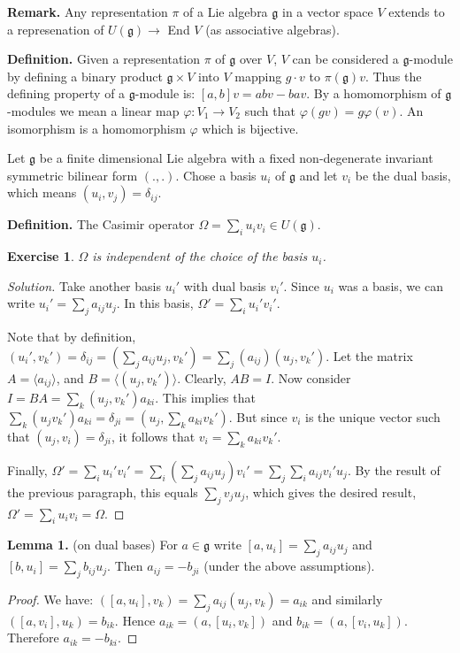 \documentclass[12pt, fullpage]{article}
\newtheorem{exercise}{Exercise}[section]
\newcommand{\g}{\mathfrak{g}}
\begin{document}
{\bf Remark.}  Any representation $\pi$ of a Lie algebra $\g$ in a vector space $V$ extends to a represenation of $U(\g) \rightarrow$ End $V$ (as associative algebras).  

{\bf Definition.}  Given a representation $\pi$ of $\g$ over $V$, $V$ can be considered a $\g$-module by defining a binary product $\g \times  V$ into $V$ mapping $g\cdot v$ to $\pi (\g) v$.  Thus the defining property of a $\g$-module is: $[a,b]v=ab v - ba v$.  By a homomorphism of $\g$-modules we mean a linear map $\varphi : V_1 \rightarrow V_2$ such that $\varphi(gv) = g \varphi(v)$.  An isomorphism is a homomorphism $\varphi$ which is bijective.  


Let $\g$ be a finite dimensional Lie algebra with a fixed non-degenerate invariant symmetric bilinear form $(.,.)$.  Chose a basis ${u_i}$ of $\g$ and let ${v_i}$ be the dual basis, which means $(u_i, v_j)= \delta_{ij}$.  

{\bf Definition.}  The Casimir operator $\Omega = \sum_i u_i v_i \in U(\g)$.

\begin{exercise}
$\Omega$ is independent of the choice of the basis ${u_i}$.
\end{exercise}
\begin{proof}[Solution]

Take another basis ${{u_i}'}$ with dual basis ${{v_i}'}$.  Since ${u_i}$ was a basis, we can write ${u_i}' = \sum_j a_{ij} u_j$.  In this basis, $\Omega' =  \sum_i {u_i}' {v_i}'$.  

Note that by definition,  $({u_i}', {v_k}') = \delta_{ij} = (\sum_j a_{ij} u_j, v_k') = \sum_j (a_{ij}) (u_j, v_k')$.  Let the matrix $A = \langle a_{ij} \rangle$, and $B = \langle (u_j, v_k') \rangle$.  Clearly, $AB=I$.  Now consider $I=BA =\sum_k (u_j, v_k') a_{ki}$.  This implies that $\sum_k (u_j v_k') a_{ki} = \delta_{ji} = (u_j, \sum_k a_{ki} v_k')$.  But since $v_i$ is the unique vector such that $(u_j, v_i) = \delta_{ji}$, it follows that $v_i = \sum_k a_{ki} v_k'$.


Finally, $\Omega' =  \sum_i {u_i}' {v_i}' = \sum_i ( \sum_j a_{ij} u_j) {v_i}' = \sum_{j} \sum_i a_{ij} {v_i}' u_j$.  By the result of the previous paragraph, this equals $\sum_j v_j u_j$, which gives the desired result, $\Omega' = \sum_i u_i v_i = \Omega$.

\end{proof}

{\bf Lemma 1.}
(on dual bases)
For $a\in\g$ write $[a,u_i]=\sum_j a_{ij}u_j$ and $[b,u_i]=\sum_j
b_{ij}u_j$.  Then $a_{ij}=-b_{ji}$ (under the above assumptions).
\begin{proof}
We have: $([a,u_i],v_k)=\sum_j a_{ij}(u_j,v_k)=a_{ik}$ and similarly
$([a,v_i],u_k)=b_{ik}$.  Hence $a_{ik} =(a,[u_i,v_k])$ and $b_{ik}
=(a,[v_i,u_k])$.  Therefore $a_{ik}=-b_{ki}$.
\end{proof}
\end{document}

